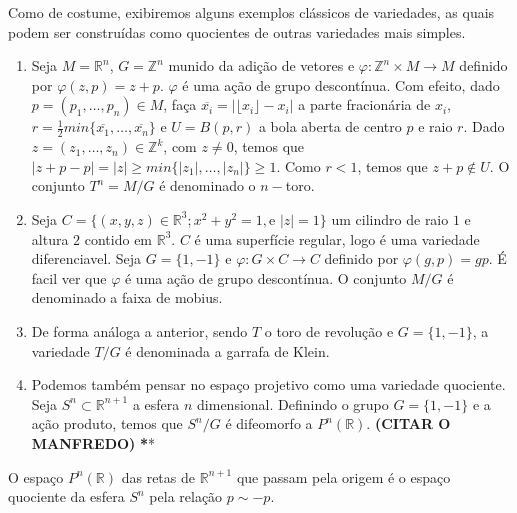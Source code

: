 Como de costume, exibiremos alguns exemplos clássicos de variedades, as quais podem ser construídas como quocientes de outras variedades mais simples.
\begin{examples}
    \label{loc:exemplos_de_variedades_quocientes}
    \begin{enumerate}
        \item Seja $M=\mathbb{R}^{n}$, $G=\mathbb{Z}^{n}$ munido da adição de vetores e $\varphi:\mathbb{Z}^{n}\times M\to M$ definido por $\varphi(z, p)=z+p$. $\varphi$ é uma ação de grupo descontínua. Com efeito, dado $p=(p_{1}, \dots, p_{n}) \in M$, faça $\overline{x_{i}}=|\lfloor x_{i} \rfloor-x_{i}|$ a parte fracionária de $x_{i}$,  $r=\frac{1}{2}min\{ \overline{x_{1}}, \dots, \overline{x_{n}}\}$ e $U=B(p, r)$ a bola aberta de centro $p$ e raio $r$. Dado $z =(z_{1}, \dots, z_{n})\in \mathbb{Z}^{k}$, com $z\neq0$, temos que $|z+p-p|=|z|\geq min\{ |z_{1}|, \dots, |z_{n}| \}\geq1$. Como $r<1$, temos que $z+p\not\in U$. O conjunto $T^{n}=M/G$ é denominado o $n-$toro.
        \item Seja $C=\{(x, y, z) \in \mathbb{R}^{3}; x^{2}+y^{2}=1, \text{e }|z|=1 \}$ um cilindro de raio $1$ e altura $2$ contido em $\mathbb{R}^{3}$. $C$ é uma superfície regular, logo é uma variedade diferenciavel. Seja $G=\{ 1, -1 \}$ e $\varphi:G\times C\to C$ definido por $\varphi(g, p)=gp$. É facil ver que $\varphi$ é uma ação de grupo descontínua. O conjunto $M/G$ é denominado a faixa de mobius.
        \item De forma análoga a anterior, sendo $T$ o toro de revolução e $G=\{ 1, -1 \}$, a variedade $T/G$ é denominada a garrafa de Klein.
        \item Podemos também pensar no espaço projetivo como uma variedade quociente. Seja $S^{n}\subset \mathbb{R}^{n+1}$ a esfera $n$ dimensional. Definindo o grupo $G=\{ 1, -1 \}$ e a ação produto, temos que $S^{n}/G$ é difeomorfo a $P^{n}(\mathbb{R})$. \textbf{(CITAR O MANFREDO)} \textbf{*}*
    \end{enumerate}
\end{examples}
\begin{example}
    \label{loc:exemplos_de_orientabilidade.espaço_projetivo}
    O espaço $P^{n}(\mathbb{R})$ das retas de $\mathbb{R}^{n+1}$ que passam pela origem é o espaço quociente da esfera $S^{n}$ pela relação $p \sim -p$.
\end{example}
